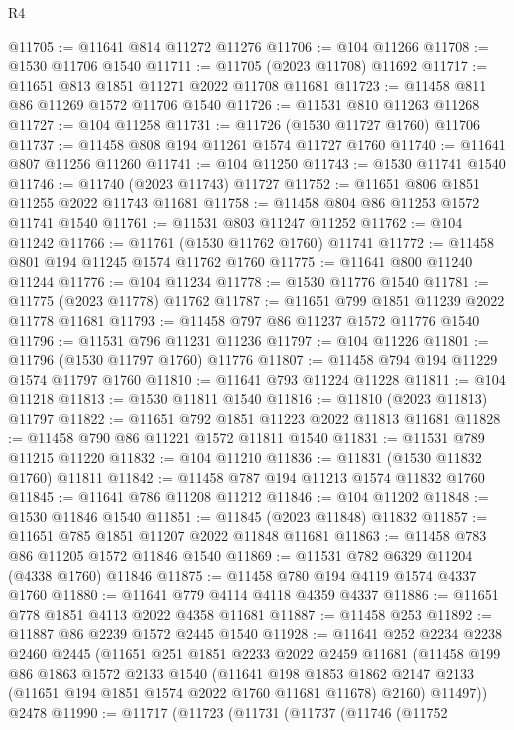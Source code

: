 \begin{lexlean}{R4}
\begin{coremodule}
@11705 := @11641 @814 @11272 @11276
@11706 := @104 @11266
@11708 := @1530 @11706 @1540
@11711 := @11705 (@2023 @11708) @11692
@11717 := @11651 @813 @1851 @11271 @2022 @11708 @11681
@11723 := @11458 @811 @86 @11269 @1572 @11706 @1540
@11726 := @11531 @810 @11263 @11268
@11727 := @104 @11258
@11731 := @11726 (@1530 @11727 @1760) @11706
@11737 := @11458 @808 @194 @11261 @1574 @11727 @1760
@11740 := @11641 @807 @11256 @11260
@11741 := @104 @11250
@11743 := @1530 @11741 @1540
@11746 := @11740 (@2023 @11743) @11727
@11752 := @11651 @806 @1851 @11255 @2022 @11743 @11681
@11758 := @11458 @804 @86 @11253 @1572 @11741 @1540
@11761 := @11531 @803 @11247 @11252
@11762 := @104 @11242
@11766 := @11761 (@1530 @11762 @1760) @11741
@11772 := @11458 @801 @194 @11245 @1574 @11762 @1760
@11775 := @11641 @800 @11240 @11244
@11776 := @104 @11234
@11778 := @1530 @11776 @1540
@11781 := @11775 (@2023 @11778) @11762
@11787 := @11651 @799 @1851 @11239 @2022 @11778 @11681
@11793 := @11458 @797 @86 @11237 @1572 @11776 @1540
@11796 := @11531 @796 @11231 @11236
@11797 := @104 @11226
@11801 := @11796 (@1530 @11797 @1760) @11776
@11807 := @11458 @794 @194 @11229 @1574 @11797 @1760
@11810 := @11641 @793 @11224 @11228
@11811 := @104 @11218
@11813 := @1530 @11811 @1540
@11816 := @11810 (@2023 @11813) @11797
@11822 := @11651 @792 @1851 @11223 @2022 @11813 @11681
@11828 := @11458 @790 @86 @11221 @1572 @11811 @1540
@11831 := @11531 @789 @11215 @11220
@11832 := @104 @11210
@11836 := @11831 (@1530 @11832 @1760) @11811
@11842 := @11458 @787 @194 @11213 @1574 @11832 @1760
@11845 := @11641 @786 @11208 @11212
@11846 := @104 @11202
@11848 := @1530 @11846 @1540
@11851 := @11845 (@2023 @11848) @11832
@11857 := @11651 @785 @1851 @11207 @2022 @11848 @11681
@11863 := @11458 @783 @86 @11205 @1572 @11846 @1540
@11869 := @11531 @782 @6329 @11204 (@4338 @1760) @11846
@11875 := @11458 @780 @194 @4119 @1574 @4337 @1760
@11880 := @11641 @779 @4114 @4118 @4359 @4337
@11886 := @11651 @778 @1851 @4113 @2022 @4358 @11681
@11887 := @11458 @253
@11892 := @11887 @86 @2239 @1572 @2445 @1540
@11928 := @11641
    @252
    @2234
    @2238
    @2460
    @2445
    (@11651
      @251
      @1851
      @2233
      @2022
      @2459
      @11681
      (@11458
        @199
        @86
        @1863
        @1572
        @2133
        @1540
        (@11641
          @198
          @1853
          @1862
          @2147
          @2133
          (@11651 @194 @1851 @1574 @2022 @1760 @11681 @11678)
          @2160)
        @11497))
    @2478
@11990 := @11717
    (@11723
      (@11731
        (@11737
          (@11746
            (@11752

\end{coremodule}
\end{lexlean}
